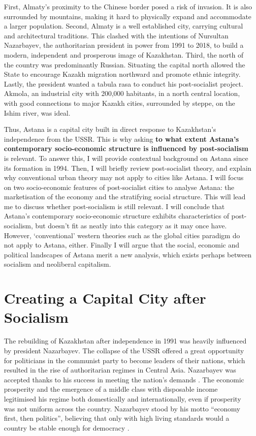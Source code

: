 \documentclass{article}
\begin{document}
First, Almaty's proximity to the Chinese border posed a risk of invasion. It is also surrounded by mountains, making it hard to physically expand and accommodate a larger population. 
Second, Almaty is a well established city, carrying cultural and architectural traditions. This clashed with the intentions of Nursultan Nazarbayev, the authoritarian president in power from 1991 to 2018, to build a modern, independent and prosperous image of Kazakhstan. 
Third, the north of the country was predominantly Russian. Situating the capital north allowed the State to encourage Kazakh migration northward and promote ethnic integrity.
Lastly, the president wanted a tabula rasa to conduct his post-socialist project. Akmola, an industrial city with 200,000 habitants, in a north central location, with good connections to major Kazakh cities, surrounded by steppe, on the Ishim river, was ideal.

Thus, Astana is a capital city built in direct response to Kazakhstan's independence from the USSR. This is why asking \textbf{to what extent Astana's contemporary socio-economic structure is influenced by post-socialism} is relevant. 
To answer this, I will provide contextual background on Astana since its formation in 1994. Then, I will briefly review post-socialist theory, and explain why conventional urban theory may not apply to cities like Astana. 
I will focus on two socio-economic features of post-socialist cities to analyse Astana: the marketisation of the economy and the stratifying social structure.
This will lead me to discuss whether post-socialism is still relevant. I will conclude that Astana's contemporary socio-economic structure exhibits characteristics of post-socialism, but doesn't fit as neatly into this category as it may once have. 
However, `conventional' western theories such as the global cities paradigm do not apply to Astana, either. 
Finally I will argue that the social, economic and political landscapes of Astana merit a new analysis, which exists perhaps between socialism and neoliberal capitalism.

\section{Creating a Capital City after Socialism}

The rebuilding of Kazakhstan after independence in 1991 was heavily influenced by president Nazarbayev. The collapse of the USSR offered a great opportunity for politicians in the communist party to become leaders of their nations, which resulted in the rise of authoritarian regimes in Central Asia. Nazarbayev was accepted thanks to his success in meeting the nation's demands \parencite{isaacs2010papa}. The economic prosperity and the emergence of a middle class with disposable income legitimised his regime both domestically and internationally, even if prosperity was not uniform across the country. Nazarbayev stood by his motto ``economy first, then politics'', believing that only with high living standards would a country be stable enough for democracy \parencite{kassymbekov_2020}.
\end{document}
